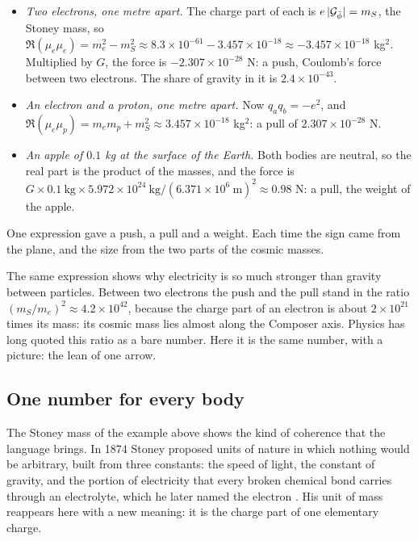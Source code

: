 \begin{workedexample}
\begin{itemize}
  \item \emph{Two electrons, one metre apart.} The charge part of each is $e\,|\mathcal{G}_{\bar{\phi}}| = m_S$, the Stoney mass, so $\Re(\mu_e\mu_e) = m_e^2 - m_S^2 \approx 8.3 \times 10^{-61} - 3.457 \times 10^{-18} \approx -3.457 \times 10^{-18}$ kg$^2$. Multiplied by $G$, the force is $-2.307 \times 10^{-28}$ N: a push, Coulomb's force between two electrons. The share of gravity in it is $2.4 \times 10^{-43}$.
  \item \emph{An electron and a proton, one metre apart.} Now $q_a q_b = -e^2$, and $\Re(\mu_e\mu_p) = m_e m_p + m_S^2 \approx 3.457 \times 10^{-18}$ kg$^2$: a pull of $2.307 \times 10^{-28}$ N.
  \item \emph{An apple of $0.1$ kg at the surface of the Earth.} Both bodies are neutral, so the real part is the product of the masses, and the force is $G \times 0.1\ \mathrm{kg} \times 5.972 \times 10^{24}\ \mathrm{kg} / (6.371 \times 10^{6}\ \mathrm{m})^2 \approx 0.98$ N: a pull, the weight of the apple.
\end{itemize}
One expression gave a push, a pull and a weight. Each time the sign came from the plane, and the size from the two parts of the cosmic masses.
\end{workedexample}

The same expression shows why electricity is so much stronger than gravity between particles. Between two electrons the push and the pull stand in the ratio $(m_S/m_e)^2 \approx 4.2 \times 10^{42}$, because the charge part of an electron is about $2 \times 10^{21}$ times its mass: its cosmic mass lies almost along the Composer axis. Physics has long quoted this ratio as a bare number. Here it is the same number, with a picture: the lean of one arrow.

\subsection{One number for every body}\label{subsec:al-bodies}

The Stoney mass of the example above shows the kind of coherence that the language brings. In 1874 Stoney proposed units of nature in which nothing would be arbitrary, built from three constants: the speed of light, the constant of gravity, and the portion of electricity that every broken chemical bond carries through an electrolyte, which he later named the electron \citep{Stoney1881,Stoney1894}. His unit of mass reappears here with a new meaning: it is the charge part of one elementary charge.

